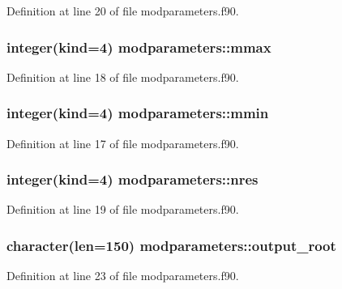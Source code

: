 Definition at line 20 of file modparameters.\-f90.

\hypertarget{classmodparameters_a1dc1488fae7094ded9408953a21ada2f}{
\subsubsection[{mmax}]{\setlength{\rightskip}{0pt plus 5cm}integer(kind=4) modparameters\-::mmax}}\label{classmodparameters_a1dc1488fae7094ded9408953a21ada2f}


Definition at line 18 of file modparameters.\-f90.

\hypertarget{classmodparameters_a4f5bb13705cae2bfb6255cf7b498aacc}{
\subsubsection[{mmin}]{\setlength{\rightskip}{0pt plus 5cm}integer(kind=4) modparameters\-::mmin}}\label{classmodparameters_a4f5bb13705cae2bfb6255cf7b498aacc}


Definition at line 17 of file modparameters.\-f90.

\hypertarget{classmodparameters_af1cb485d0a4ab3c8e0c54b81973aff9a}{
\subsubsection[{nres}]{\setlength{\rightskip}{0pt plus 5cm}integer(kind=4) modparameters\-::nres}}\label{classmodparameters_af1cb485d0a4ab3c8e0c54b81973aff9a}


Definition at line 19 of file modparameters.\-f90.

\hypertarget{classmodparameters_a95d5a1eac507fc27906f93bd48c77d10}{
\subsubsection[{output\-\_\-root}]{\setlength{\rightskip}{0pt plus 5cm}character(len=150) modparameters\-::output\-\_\-root}}\label{classmodparameters_a95d5a1eac507fc27906f93bd48c77d10}


Definition at line 23 of file modparameters.\-f90.

